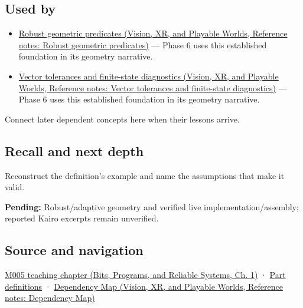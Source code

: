 \subsection{Used by}\label{appendix-5aef4f13483a-used-by}

\begin{itemize}
\tightlist
\item
  \href{../07-Vision-XR-and-Playable-Worlds/main.pdf\#nameddest=appendix-341296fb3f64}{Robust geometric predicates (Vision, XR, and Playable Worlds, Reference notes: Robust geometric predicates)} --- Phase 6 uses this established foundation in its geometry narrative.
\item
  \href{../07-Vision-XR-and-Playable-Worlds/main.pdf\#nameddest=appendix-b5b83329215b}{Vector tolerances and finite-state diagnostics (Vision, XR, and Playable Worlds, Reference notes: Vector tolerances and finite-state diagnostics)} --- Phase 6 uses this established foundation in its geometry narrative.
\end{itemize}

Connect later dependent concepts here when their lessons arrive.

\subsection{Recall and next depth}\label{appendix-5aef4f13483a-recall-and-next-depth}

Reconstruct the definition's example and name the assumptions that make it valid.

\textbf{Pending:} Robust/adaptive geometry and verified live implementation/assembly; reported Kairo excerpts remain unverified.

\subsection{Source and navigation}\label{appendix-5aef4f13483a-source-and-navigation}

\href{../01-Bits-Programs-and-Reliable-Systems/main.pdf\#nameddest=01-foundations-i-ch001-when-arithmetic-meets-uncertainty}{M005 teaching chapter (Bits, Programs, and Reliable Systems, Ch. 1)} · \hyperref[appendix-fd090d982a15-m005---parts-77-88]{Part definitions} · \href{../07-Vision-XR-and-Playable-Worlds/main.pdf\#nameddest=appendix-4ad47bdd269a}{Dependency Map (Vision, XR, and Playable Worlds, Reference notes: Dependency Map)}
